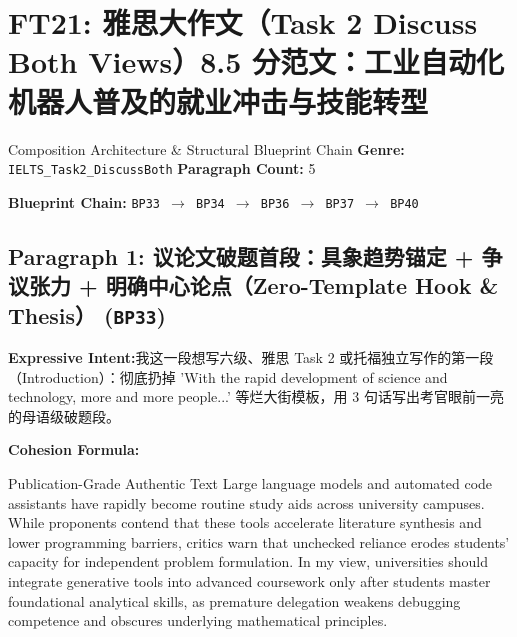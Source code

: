 \section{FT21: 雅思大作文（Task 2 Discuss Both Views）8.5 分范文：工业自动化机器人普及的就业冲击与技能转型}\label{comp:FT21}
\begin{ConceptBox}{Composition Architecture \& Structural Blueprint Chain}
\textbf{Genre:} \texttt{IELTS\_Task2\_DiscussBoth} \quad \textbf{Paragraph Count:} 5\par
\textbf{Blueprint Chain:} \texttt{BP33 $\to$ BP34 $\to$ BP36 $\to$ BP37 $\to$ BP40}
\end{ConceptBox}
\subsection*{Paragraph 1: 议论文破题首段：具象趋势锚定 + 争议张力 + 明确中心论点（Zero-Template Hook \& Thesis） (\texttt{BP33})}
\noindent\textbf{Expressive Intent:}\enspace 我这一段想写六级、雅思 Task 2 或托福独立写作的第一段（Introduction）：彻底扔掉 'With the rapid development of science and technology, more and more people...' 等烂大街模板，用 3 句话写出考官眼前一亮的母语级破题段。\par
\noindent\textbf{Cohesion Formula:}\par\vspace{4pt}
\begin{ExampleBox}{Publication-Grade Authentic Text}
Large language models and automated code assistants have rapidly become routine study aids across university campuses. While proponents contend that these tools accelerate literature synthesis and lower programming barriers, critics warn that unchecked reliance erodes students' capacity for independent problem formulation. In my view, universities should integrate generative tools into advanced coursework only after students master foundational analytical skills, as premature delegation weakens debugging competence and obscures underlying mathematical principles.
\end{ExampleBox}
